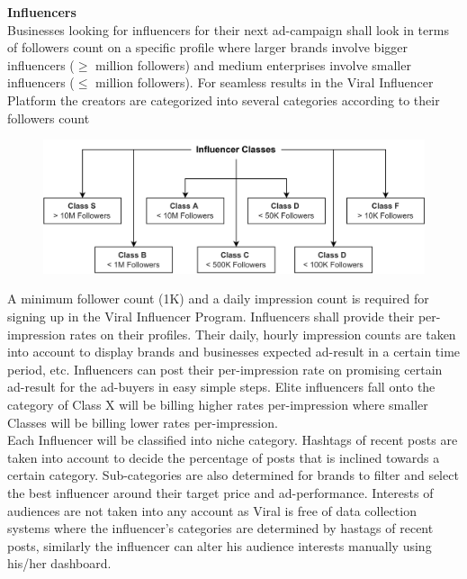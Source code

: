\documentclass[10pt]{article}
\begin{document}
\textbf{Influencers}\\

Businesses looking for influencers for their next ad-campaign shall look in terms of followers count on a specific profile where larger brands involve bigger influencers ($\geq$ million followers) and medium enterprises involve smaller influencers ($\leq$ million followers). For seamless results in the Viral Influencer Platform the creators are categorized into several categories according to their followers count
\begin{figure}[H]
\begin{center}
\includegraphics[width=\textwidth]{influencer-class}
\end{center}
\end{figure}

A minimum follower count (1K) and a daily impression count is required for signing up in the Viral Influencer Program. Influencers shall provide their per-impression rates on their profiles. Their daily, hourly impression counts are taken into account to display brands and businesses expected ad-result in a certain time period, etc. Influencers can post their per-impression rate on promising certain ad-result for the ad-buyers in easy simple steps. Elite influencers fall onto the category of Class X will be billing higher rates per-impression where smaller Classes will be billing lower rates per-impression. \\

Each Influencer will be classified into niche category. Hashtags of recent posts are taken into account to decide the percentage of posts that is inclined towards a certain category. Sub-categories are also determined for brands to filter and select the best influencer around their target price and ad-performance. Interests of audiences are not taken into any account as Viral is free of data collection systems where the influencer's categories are determined by hastags of recent posts, similarly the influencer can alter his audience interests manually using his/her dashboard.\\
\end{document}
